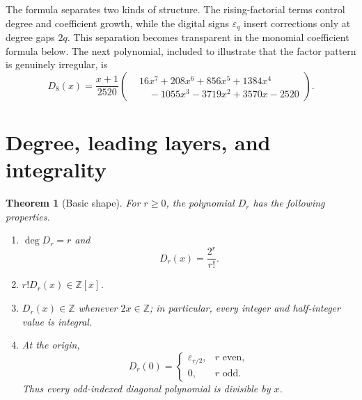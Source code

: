 \documentclass[11pt,a4paper,oneside,openany]{book}
\numberwithin{equation}{chapter}
\newtheorem{theorem}{Theorem}[chapter]
\theoremstyle{definition}
\theoremstyle{remark}
\newcommand{\Z}{\mathbb Z}
\newcommand{\eps}{\varepsilon}
\newcommand{\Diag}{D}
\begin{document}
The formula separates two kinds of structure.  The rising-factorial terms
control degree and coefficient growth, while the digital signs \(\eps_q\)
insert corrections only at degree gaps \(2q\).  This separation becomes
transparent in the monomial coefficient formula below.
The next polynomial, included to illustrate that the
factor pattern is genuinely irregular, is
\begin{equation}
 \Diag_8(x)=\frac{x+1}{2520}
 \left(
 \begin{aligned}
  &16x^7+208x^6+856x^5+1384x^4\\[-0.2em]
  &\quad{}-1055x^3-3719x^2+3570x-2520
 \end{aligned}
 \right).
 \label{b:eq:D8}
\end{equation}
\section{Degree, leading layers, and integrality}

\begin{theorem}[Basic shape]
For \(r\ge0\), the polynomial \(\Diag_r\) has the following properties.
\begin{enumerate}
\item \(\deg \Diag_r=r\) and
\begin{equation}
 [x^r]\Diag_r(x)=\frac{2^r}{r!}.
 \label{a:eq:leading-coefficient}
\end{equation}
\item \(r!\Diag_r(x)\in\Z[x]\).
\item \(\Diag_r(x)\in\Z\) whenever \(2x\in\Z\); in particular, every
integer and half-integer value is integral.
\item At the origin,
\begin{equation}
 \Diag_r(0)=
 \begin{cases}
 \eps_{r/2},&r\text{ even},\\
 0,&r\text{ odd}.
 \end{cases}
 \label{a:eq:origin-values}
\end{equation}
Thus every odd-indexed diagonal polynomial is divisible by \(x\).
\end{enumerate}
\end{theorem}
\end{document}
